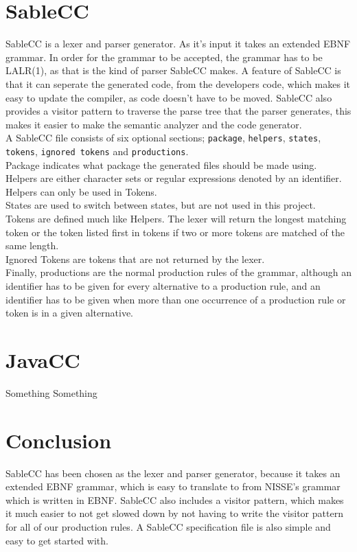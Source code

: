 \section{SableCC}
SableCC is a lexer and parser generator. As it's input it takes an extended EBNF grammar. In order for the grammar to be accepted, the grammar has to be LALR(1), as that is the kind of parser SableCC makes. A feature of SableCC is that it can seperate the generated code, from the developers code, which makes it easy to update the compiler, as code doesn't have to be moved. SableCC also provides a visitor pattern to traverse the parse tree that the parser generates, this makes it easier to make the semantic analyzer and the code generator.\\
A SableCC file consists of six optional sections; \texttt{package}, \texttt{helpers}, \texttt{states}, \texttt{tokens}, \texttt{ignored tokens} and \texttt{productions}.\\
Package indicates what package the generated files should be made using. \\
Helpers are either character sets or regular expressions denoted by an identifier. Helpers can only be used in Tokens. \\
States are used to switch between states, but are not used in this project. \\
Tokens are defined much like Helpers. The lexer will return the longest matching token or the token listed first in tokens if two or more tokens are matched of the same length. \\
Ignored Tokens are tokens that are not returned by the lexer. \\
Finally, productions are the normal production rules of the grammar, although an identifier has to be given for every alternative to a production rule, and an identifier has to be given when more than one occurrence of a production rule or token is in a given alternative.\\

\section{JavaCC}
Something Something


\section{Conclusion}
SableCC has been chosen as the lexer and parser generator, because it takes an extended EBNF grammar, which is easy to translate to from NISSE's grammar which is written in EBNF. SableCC also includes a visitor pattern, which makes it much easier to not get slowed down by not having to write the visitor pattern for all of our production rules. A SableCC specification file is also simple and easy to get started with.